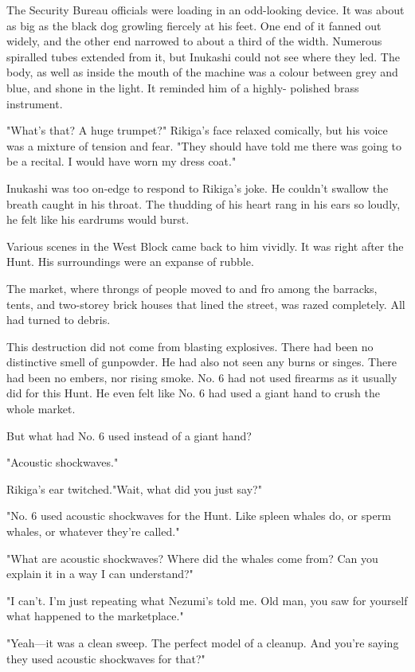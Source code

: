 The Security Bureau officials were loading in an odd-looking device. It
was about as big as the black dog growling fiercely at his feet. One end
of it fanned out widely, and the other end narrowed to about a third of
the width. Numerous spiralled tubes extended from it, but Inukashi could
not see where they led. The body, as well as inside the mouth of the
machine was a colour between grey and blue, and shone in the light. It
reminded him of a highly- polished brass instrument.

"What's that? A huge trumpet?" Rikiga's face relaxed comically, but his
voice was a mixture of tension and fear. "They should have told me there
was going to be a recital. I would have worn my dress coat."

Inukashi was too on-edge to respond to Rikiga's joke. He couldn't
swallow the breath caught in his throat. The thudding of his heart rang
in his ears so loudly, he felt like his eardrums would burst.

Various scenes in the West Block came back to him vividly. It was right
after the Hunt. His surroundings were an expanse of rubble.

The market, where throngs of people moved to and fro among the barracks,
tents, and two-storey brick houses that lined the street, was razed
completely. All had turned to debris.

This destruction did not come from blasting explosives. There had been
no distinctive smell of gunpowder. He had also not seen any burns or
singes. There had been no embers, nor rising smoke. No. 6 had not used
firearms as it usually did for this Hunt. He even felt like No. 6 had
used a giant hand to crush the whole market.

But what had No. 6 used instead of a giant hand?

"Acoustic shockwaves."

Rikiga's ear twitched."Wait, what did you just say?"

"No. 6 used acoustic shockwaves for the Hunt. Like spleen whales do, or
sperm whales, or whatever they're called."

"What are acoustic shockwaves? Where did the whales come from? Can you
explain it in a way I can understand?"

"I can't. I'm just repeating what Nezumi's told me. Old man, you saw for
yourself what happened to the marketplace."

"Yeah---it was a clean sweep. The perfect model of a cleanup. And you're
saying they used acoustic shockwaves for that?"

